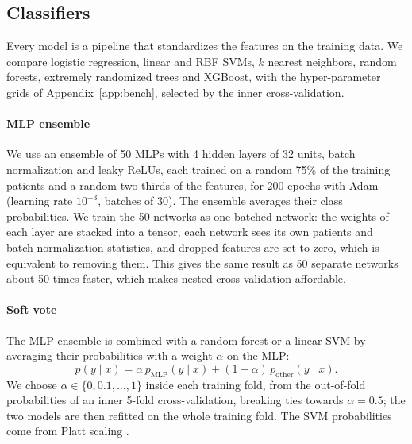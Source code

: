 \begin{table}[!htb]
\centering
\small

\end{table}

\subsection{Classifiers}
Every model is a pipeline that standardizes the features on the training data. We compare logistic regression, linear and RBF SVMs, $k$ nearest neighbors, random forests, extremely randomized trees and XGBoost, with the hyper-parameter grids of Appendix~\ref{app:bench}, selected by the inner cross-validation.

\paragraph{MLP ensemble}
We use an ensemble of 50 MLPs with 4 hidden layers of 32 units, batch normalization and leaky ReLUs, each trained on a random 75\% of the training patients and a random two thirds of the features, for 200 epochs with Adam (learning rate $10^{-3}$, batches of 30). The ensemble averages their class probabilities. We train the 50 networks as one batched network: the weights of each layer are stacked into a tensor, each network sees its own patients and batch-normalization statistics, and dropped features are set to zero, which is equivalent to removing them. This gives the same result as 50 separate networks about 50 times faster, which makes nested cross-validation affordable.

\paragraph{Soft vote}
The MLP ensemble is combined with a random forest or a linear SVM by averaging their probabilities with a weight $\alpha$ on the MLP:
\begin{equation}
  p(y\mid x) = \alpha\, p_{\mathrm{MLP}}(y\mid x) + (1-\alpha)\, p_{\mathrm{other}}(y\mid x).
  \label{eq:softvote}
\end{equation}
We choose $\alpha\in\{0, 0.1, \dots, 1\}$ inside each training fold, from the out-of-fold probabilities of an inner 5-fold cross-validation, breaking ties towards $\alpha=0.5$; the two models are then refitted on the whole training fold. The SVM probabilities come from Platt scaling \citep{platt1999}.
